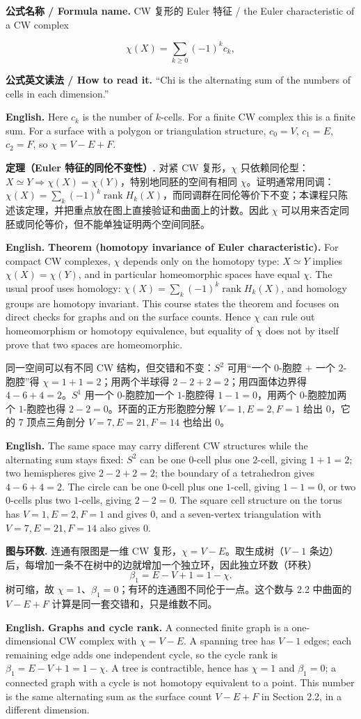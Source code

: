 \documentclass[UTF8,11pt,a4paper]{ctexart}
\newcommand{\EN}[1]{\par\noindent\textbf{English.} #1\par}
\newcommand{\READ}[1]{\par\noindent\textbf{公式英文读法 / How to read it.} #1\par}
\newcommand{\FORMULA}[2]{\par\noindent\textbf{公式名称 / Formula name.} #1 / #2\par}
\begin{document}
\FORMULA{CW 复形的 Euler 特征}{the Euler characteristic of a CW complex}
\[
\chi(X)=\sum_{k\ge0}(-1)^k c_k,
\]
\READ{``Chi is the alternating sum of the numbers of cells in each dimension.''}
\EN{Here $c_k$ is the number of $k$-cells. For a finite CW complex this is a finite sum. For a surface with a polygon or triangulation structure, $c_0=V$, $c_1=E$, $c_2=F$, so $\chi=V-E+F$.}

\noindent\textbf{定理（Euler 特征的同伦不变性）.} 对紧 CW 复形，$\chi$ 只依赖同伦型：$X\simeq Y\Rightarrow\chi(X)=\chi(Y)$，特别地同胚的空间有相同 $\chi$。证明通常用同调：$\chi(X)=\sum_k(-1)^k\operatorname{rank}H_k(X)$，而同调群在同伦等价下不变；本课程只陈述该定理，并把重点放在图上直接验证和曲面上的计数。因此 $\chi$ 可以用来否定同胚或同伦等价，但不能单独证明两个空间同胚。
\EN{\textbf{Theorem (homotopy invariance of Euler characteristic).} For compact CW complexes, $\chi$ depends only on the homotopy type: $X\simeq Y$ implies $\chi(X)=\chi(Y)$, and in particular homeomorphic spaces have equal $\chi$. The usual proof uses homology: $\chi(X)=\sum_k(-1)^k\operatorname{rank}H_k(X)$, and homology groups are homotopy invariant. This course states the theorem and focuses on direct checks for graphs and on the surface counts. Hence $\chi$ can rule out homeomorphism or homotopy equivalence, but equality of $\chi$ does not by itself prove that two spaces are homeomorphic.}

\noindent 同一空间可以有不同 CW 结构，但交错和不变：$S^2$ 可用“一个 $0$-胞腔 $+$ 一个 $2$-胞腔”得 $\chi=1+1=2$；用两个半球得 $2-2+2=2$；用四面体边界得 $4-6+4=2$。$S^1$ 用一个 $0$-胞腔加一个 $1$-胞腔得 $1-1=0$，用两个 $0$-胞腔加两个 $1$-胞腔也得 $2-2=0$。环面的正方形胞腔分解 $V=1,E=2,F=1$ 给出 $0$，它的 $7$ 顶点三角剖分 $V=7,E=21,F=14$ 也给出 $0$。
\EN{The same space may carry different CW structures while the alternating sum stays fixed: $S^2$ can be one $0$-cell plus one $2$-cell, giving $1+1=2$; two hemispheres give $2-2+2=2$; the boundary of a tetrahedron gives $4-6+4=2$. The circle can be one $0$-cell plus one $1$-cell, giving $1-1=0$, or two $0$-cells plus two $1$-cells, giving $2-2=0$. The square cell structure on the torus has $V=1,E=2,F=1$ and gives $0$, and a seven-vertex triangulation with $V=7,E=21,F=14$ also gives $0$.}

\noindent\textbf{图与环数.} 连通有限图是一维 CW 复形，$\chi=V-E$。取生成树（$V-1$ 条边）后，每增加一条不在树中的边就增加一个独立环，因此独立环数（环秩）
\[
\beta_1=E-V+1=1-\chi .
\]
树可缩，故 $\chi=1$、$\beta_1=0$；有环的连通图不同伦于一点。这个数与 2.2 中曲面的 $V-E+F$ 计算是同一套交错和，只是维数不同。
\EN{\textbf{Graphs and cycle rank.} A connected finite graph is a one-dimensional CW complex with $\chi=V-E$. A spanning tree has $V-1$ edges; each remaining edge adds one independent cycle, so the cycle rank is $\beta_1=E-V+1=1-\chi$. A tree is contractible, hence has $\chi=1$ and $\beta_1=0$; a connected graph with a cycle is not homotopy equivalent to a point. This number is the same alternating sum as the surface count $V-E+F$ in Section 2.2, in a different dimension.}
\end{document}
